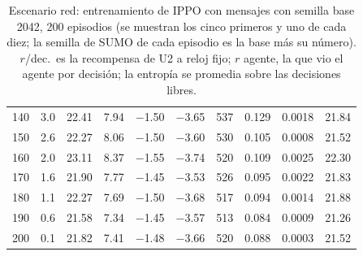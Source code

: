 \begin{table}[H]
\begin{tabular}{rrrrrrrrrr}
140 & 3.0 & 22.41 & 7.94 & $-$1.50 & $-$3.65 & 537 & 0.129 & 0.0018 & 21.84 \\
150 & 2.6 & 22.27 & 8.06 & $-$1.50 & $-$3.60 & 530 & 0.105 & 0.0008 & 21.52 \\
160 & 2.0 & 23.11 & 8.37 & $-$1.55 & $-$3.74 & 520 & 0.109 & 0.0025 & 22.30 \\
170 & 1.6 & 21.90 & 7.77 & $-$1.45 & $-$3.53 & 526 & 0.095 & 0.0022 & 21.83 \\
180 & 1.1 & 22.27 & 7.69 & $-$1.50 & $-$3.68 & 517 & 0.094 & 0.0014 & 21.88 \\
190 & 0.6 & 21.58 & 7.34 & $-$1.45 & $-$3.57 & 513 & 0.084 & 0.0009 & 21.26 \\
200 & 0.1 & 21.82 & 7.41 & $-$1.48 & $-$3.66 & 520 & 0.088 & 0.0003 & 21.52 \\
\bottomrule
\end{tabular}
\caption[Escenario red: entrenamiento de IPPO con mensajes, semilla base 2042]{Escenario red: entrenamiento de IPPO con mensajes con semilla base 2042, 200 episodios (se muestran los cinco primeros y uno de cada diez; la semilla de SUMO de cada episodio es la base más su número). $r$/dec.\ es la recompensa de U2 a reloj fijo; $r$ agente, la que vio el agente por decisión; la entropía se promedia sobre las decisiones libres.}
\label{tab:red-ippo-vecinos-2042}
\end{table}

